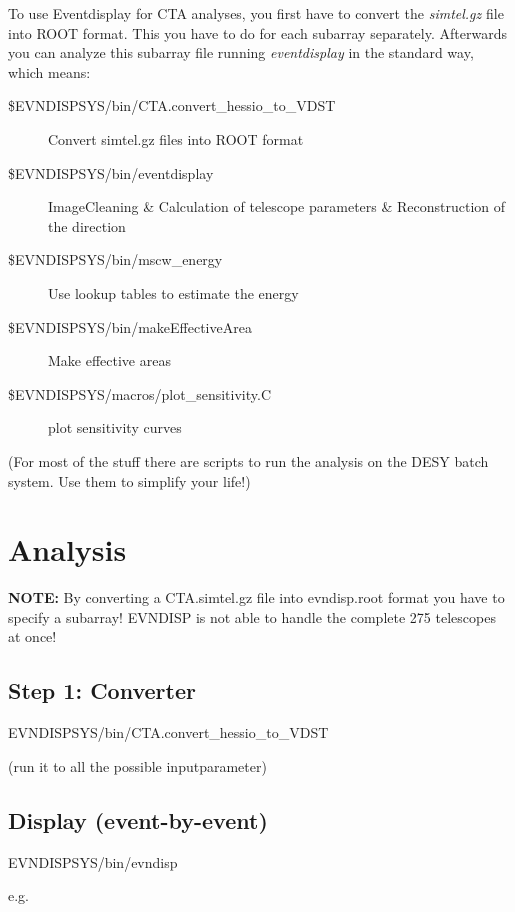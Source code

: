 \documentclass[titlepage,a4paper,twoside,11pt]{report}
\begin{document}
To use Eventdisplay for CTA analyses, you first have to convert the {\it simtel.gz} file into ROOT format. 
This you have to do for each subarray separately.
Afterwards you can analyze this subarray file running {\it eventdisplay} in the standard way, which means:

\begin{description}
\item[\$EVNDISPSYS/bin/CTA.convert\_hessio\_to\_VDST]
        Convert simtel.gz files into ROOT format

\item[\$EVNDISPSYS/bin/eventdisplay]
	ImageCleaning \& Calculation of telescope parameters \& Reconstruction of the direction

\item[\$EVNDISPSYS/bin/mscw\_energy]
        Use lookup tables to estimate the energy

\item[\$EVNDISPSYS/bin/makeEffectiveArea]
        Make effective areas

\item[\$EVNDISPSYS/macros/plot\_sensitivity.C]
        plot sensitivity curves
\end{description}

(For most of the stuff there are scripts to run the analysis on the DESY batch system. Use them to simplify your life!)

\section{Analysis}

{\bf NOTE:}
By converting a CTA.simtel.gz file into evndisp.root format you have to specify a subarray!
EVNDISP is not able to handle the complete 275 telescopes at once!

\subsection{Step 1: Converter}

EVNDISPSYS/bin/CTA.convert\_hessio\_to\_VDST

(run it to all the possible inputparameter)

\subsection{Display (event-by-event)}

EVNDISPSYS/bin/evndisp

e.g. 
\end{document}
